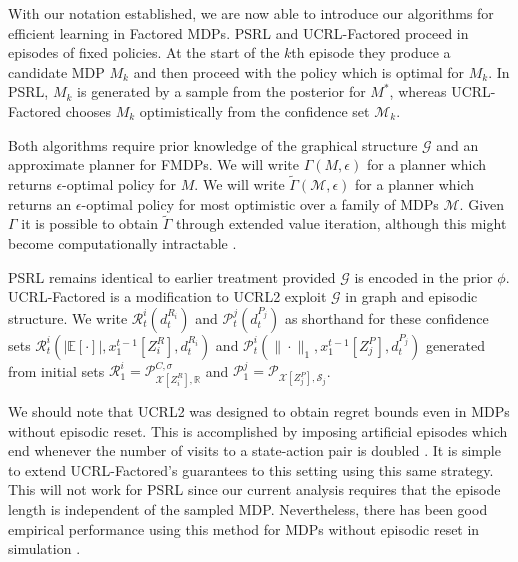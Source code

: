 \documentclass{article}
\newcommand{\Exp}{\mathds{E}}
\newcommand{\Real}{\mathds{R}}
\newcommand{\Xc}{\mathcal{X}}
\newcommand{\Pc}{\mathcal{P}}
\newcommand{\Gc}{\mathcal{G}}
\newcommand{\Rc}{\mathcal{R}}
\newcommand{\Sc}{\mathcal{S}}
\newcommand{\Mc}{\mathcal{M}}
\begin{document}
With our notation established, we are now able to introduce our algorithms for efficient learning in Factored MDPs.
PSRL and UCRL-Factored proceed in episodes of fixed policies.
At the start of the $k$th episode they produce a candidate MDP $M_k$ and then proceed with the policy which is optimal for $M_k$.
In PSRL, $M_k$ is generated by a sample from the posterior for $M^*$, whereas UCRL-Factored chooses $M_k$ optimistically from the confidence set $\Mc_k$.

Both algorithms require prior knowledge of the graphical structure $\Gc$ and an approximate planner for FMDPs.
We will write $\Gamma(M,\epsilon)$ for a planner which returns $\epsilon$-optimal policy for $M$.
We will write $\tilde{\Gamma}(\Mc,\epsilon)$ for a planner which returns an $\epsilon$-optimal policy for most optimistic over a family of MDPs $\Mc$.
Given $\Gamma$ it is possible to obtain $\tilde{\Gamma}$ through extended value iteration, although this might become computationally intractable \cite{jaksch2010near}.

PSRL remains identical to earlier treatment \cite{strens2000bayesian, osband2013more} provided $\Gc$ is encoded in the prior $\phi$.
UCRL-Factored is a modification to UCRL2 exploit $\Gc$ in graph and episodic structure.
We write $\Rc^i_t(d_t^{R_i})$ and $\Pc^j_t(d_t^{P_j})$ as shorthand for these confidence sets
$\Rc^i_t( | \Exp[\cdot] |, x^{t-1}_1[Z^R_i],d_t^{R_i})$ and $\Pc^i_t( \| \cdot \|_1, x^{t-1}_1[Z^P_j],d_t^{P_j})$
generated from initial sets $\Rc^i_1 = \Pc^{C,\sigma}_{\Xc[Z^R_i],\Real}$ and $\Pc^j_1 = \Pc_{\Xc[Z^P_j],\Sc_j}$.

We should note that UCRL2 was designed to obtain regret bounds even in MDPs without episodic reset.
This is accomplished by imposing artificial episodes which end whenever the number of visits to a state-action pair is doubled \cite{jaksch2010near}.
It is simple to extend UCRL-Factored's guarantees to this setting using this same strategy.
This will not work for PSRL since our current analysis requires that the episode length is independent of the sampled MDP.
Nevertheless, there has been good empirical performance using this method for MDPs without episodic reset in simulation \cite{osband2013more}.


\end{document}
